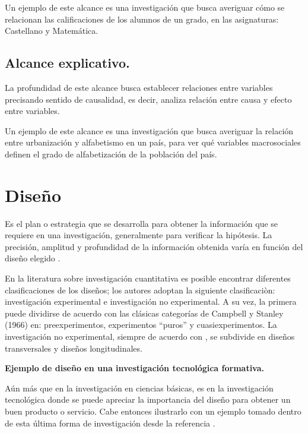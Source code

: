 Un ejemplo de este alcance es una investigación que busca averiguar cómo se relacionan las calificaciones de los alumnos de un grado, en las asignaturas: Castellano y Matemática.

\subsection{Alcance explicativo.}
La profundidad de este alcance busca establecer relaciones entre variables precisando sentido de causalidad, es decir, analiza relación entre causa y efecto entre variables.

Un ejemplo de este alcance es una investigación que busca averiguar la relación entre urbanización y alfabetismo en un país, para ver qué variables macrosociales definen el grado de alfabetización de la población del país.

\section{Diseño}
Es el plan o estrategia que se desarrolla para obtener la información que se requiere en una investigación, generalmente para verificar la hipótesis. La precisión, amplitud y profundidad de la información obtenida varía en función del diseño elegido \cite{sampieri}.

En la literatura sobre investigación cuantitativa es posible encontrar diferentes clasificaciones de los diseños; los autores \cite{sampieri} adoptan la siguiente clasificaciòn: investigación experimental e investigación no experimental. A su vez, la primera puede dividirse de acuerdo con las clásicas categorías de Campbell y Stanley (1966) en: preexperimentos, experimentos ``puros'' y cuasiexperimentos. La investigación no experimental, siempre de acuerdo con \cite{sampieri}, se subdivide en diseños transversales y diseños longitudinales.

\vspace{.5 cm}

\textbf{Ejemplo de diseño en una investigación tecnológica formativa.}

Aún más que en la investigación en ciencias básicas, es en la investigación tecnológica donde se puede apreciar la importancia del diseño para obtener un buen producto o servicio. Cabe entonces ilustrarlo con un ejemplo tomado dentro de esta última forma de investigación desde la referencia \cite{lan}.

\vspace{.5 cm}

